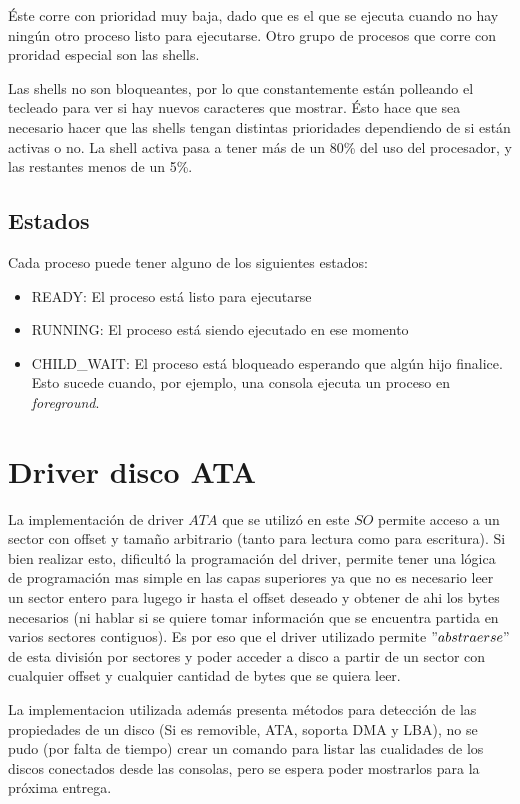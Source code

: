 \documentclass[english]{article}
\begin{document}
Éste corre con prioridad muy baja, dado que es el que se ejecuta cuando no hay ningún otro proceso listo para ejecutarse. Otro grupo de procesos que corre con proridad especial son las shells.

Las shells no son bloqueantes, por lo que constantemente están polleando el tecleado para ver si hay nuevos caracteres que mostrar. Ésto hace que sea necesario hacer que las shells tengan distintas prioridades dependiendo de si están activas o no. La shell activa pasa a tener más de un 80\% del uso del procesador, y las restantes menos de un 5\%.

\subsection{Estados}
Cada proceso puede tener alguno de los siguientes estados:
\begin{itemize}
\item READY: El proceso está listo para ejecutarse
\item RUNNING: El proceso está siendo ejecutado en ese momento
\item CHILD\_WAIT: El proceso está bloqueado esperando que algún hijo finalice. Esto sucede cuando, por ejemplo, una consola ejecuta un proceso en \emph{foreground}.
\end{itemize}

\pagebreak{}

\section{Driver disco ATA}

La implementación de driver $ATA$ que se utilizó en este $SO$ permite
acceso a un sector con offset y tamaño arbitrario (tanto para lectura
como para escritura). Si bien realizar esto, dificultó la programación
del driver, permite tener una lógica de programación mas simple en
las capas superiores ya que no es necesario leer un sector entero
para lugego ir hasta el offset deseado y obtener de ahi los bytes
necesarios (ni hablar si se quiere tomar información que se encuentra
partida en varios sectores contiguos). Es por eso que el driver utilizado
permite $"abstraerse"$ de esta división por sectores y poder acceder
a disco a partir de un sector con cualquier offset y cualquier cantidad
de bytes que se quiera leer.

La implementacion utilizada además presenta métodos para detección
de las propiedades de un disco (Si es removible, ATA, soporta DMA
y LBA), no se pudo (por falta de tiempo) crear un comando para listar
las cualidades de los discos conectados desde las consolas, pero se
espera poder mostrarlos para la próxima entrega.
\end{document}
